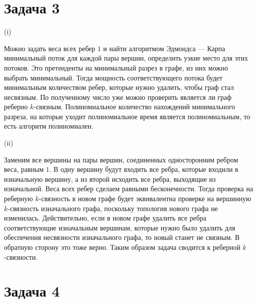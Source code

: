 \documentclass[a4paper,12pt]{article} %
\begin{document}
\section{Задача 3}
\hspace{5mm}
(i)

Можно задать веса всех ребер $1$ и найти алгоритмом Эдмондса — Карпа минимальный поток для каждой пары вершин, определить узкие место для этих потоков. Это претенденты на минимальный разрез в графе, из них можно выбрать минимальный. Тогда мощность соответствующего потока будет минимальным количеством ребер, которые нужно удалить, чтобы граф стал несвязным. По полученному число уже можно проверить является ли граф реберно $k$-связным. Полиномиальное количество нахождений минимального разреза, на которые уходит полиномиальное время является полиномиальным, то есть алгоритм полиномиален.

(ii)

Заменим все вершины на пары вершин, соединенных односторонним ребром веса, равным $1$. В одну вершину будут входить все ребра, которые входили в изначальную вершину, а из второй исходить все ребра, выходящие из изначальной. Веса всех ребер сделаем равными бесконечности. Тогда проверка на реберную $k$-связность в новом графе будет эквивалентна проверке на вершинную $k$-связность изначального графа, поскольку топология нового графа не изменилась. Действительно, если в новом графе удалить все ребра соответствующие изначальным вершинам, которые нужно было удалить для обеспечения несвязности изначального графа, то новый станет не связным. В обратную сторону это тоже верно. Таким образом задача сводится к реберной $k$-связности.

\section{Задача 4}
\hspace{5mm}
\end{document}
